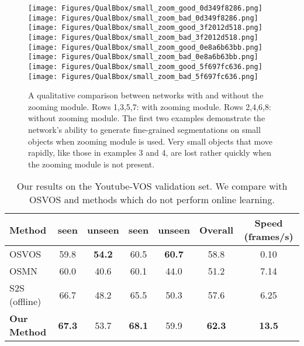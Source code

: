 \documentclass[10pt,twocolumn,letterpaper]{article}
\begin{document}
\begin{figure*}[ht!]
\begin{center}
\texttt{[image: Figures/QualBbox/small\_zoom\_good\_0d349f8286.png]}
\texttt{[image: Figures/QualBbox/small\_zoom\_bad\_0d349f8286.png]}
\texttt{[image: Figures/QualBbox/small\_zoom\_good\_3f2012d518.png]}
\texttt{[image: Figures/QualBbox/small\_zoom\_bad\_3f2012d518.png]}
\texttt{[image: Figures/QualBbox/small\_zoom\_good\_0e8a6b63bb.png]}
\texttt{[image: Figures/QualBbox/small\_zoom\_bad\_0e8a6b63bb.png]}
\texttt{[image: Figures/QualBbox/small\_zoom\_good\_5f697fc636.png]}
\texttt{[image: Figures/QualBbox/small\_zoom\_bad\_5f697fc636.png]}

\end{center}
   \caption{A qualitative comparison between networks with and without the zooming module. Rows 1,3,5,7: with zooming module. Rows 2,4,6,8: without zooming module. The first two examples demonstrate the network's ability to generate fine-grained segmentations on small objects when zooming module is used.  Very small objects that move rapidly, like those in examples 3 and 4, are lost rather quickly when the zooming module is not present.}
\label{fig:qualitative-bbox}
\end{figure*}


\begin{table*}[ht!]
    \centering
    \begin{tabular}{l|c|c|c|c|c|c}
        Method &  seen &  unseen &  seen &  unseen & Overall & Speed (frames/s) \\
        \hline
        OSVOS \cite{caelles2017one} & 59.8 & {\bf 54.2} & 60.5 & {\bf 60.7 } & 58.8 & 0.10 \\
        OSMN \cite{yang2018efficient} & 60.0 & 40.6 & 60.1 & 44.0 & 51.2 & 7.14 \\
        S2S (offline) \cite{xu2018youtube} & 66.7 & 48.2 & 65.5 & 50.3 & 57.6 & 6.25 \\
        \hline
        {\bf Our Method} &  {\bf 67.3} & 53.7 & {\bf 68.1} & 59.9 & {\bf 62.3} & {\bf 13.5}\\
\end{tabular}
    \caption{Our results on the Youtube-VOS validation set. We compare with OSVOS \cite{caelles2017one} and methods which do not perform online learning.}
    \label{tab:youtubevos}
\end{table*}
\end{document}
